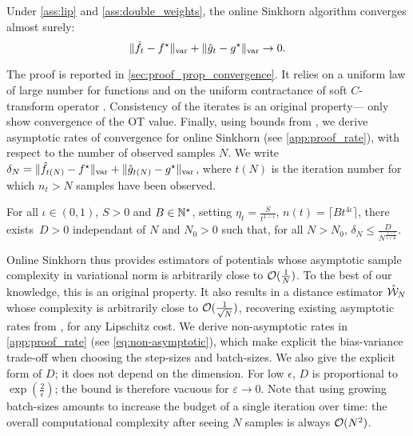 \begin{proposition}\label{prop:convergence_true}
    Under \autoref{ass:lip} and
    \ref{ass:double_weights}, the online Sinkhorn algorithm converges almost surely:
    \begin{equation}
        \Vert \hat f_t - f^\star \Vert_{\text{\upshape var}} + \Vert \hat g_t - g^\star \Vert_{\text{\upshape var}} \to 0.
    \end{equation}
\end{proposition}

The proof is reported in \autoref{sec:proof_prop_convergence}. It relies on a uniform
law of large number for functions \citep[][chapter
19]{van_der_vaart_asymptotic_2000} and on the uniform contractance of soft
$C$-transform operator \citep[e.g.][Proposition 19]{vialard2019elementary}. Consistency of the iterates is an original property---\cite{2016-genevay-nips} only show convergence of the OT value. Finally, using bounds from \cite{moulines_non-asymptotic_2011}, we derive  asymptotic rates of convergence for online Sinkhorn (see \autoref{app:proof_rate}), with
respect to the number of observed samples $N$. We write $\delta_N = \Vert \hat
f_{t(N)} - f^\star \Vert_{\text{\upshape var}} + \Vert \hat g_{t(N)} - g^\star \Vert_{\text{\upshape var}}$,
where $t(N)$ is the iteration number for which $n_t > N$ samples have been observed.

\begin{proposition}\label{prop:rate}
    For all $\iota \in (0, 1)$, $S > 0$ and $B \in \mathbb{N}^\star$, setting $\eta_t =
    \frac{S}{t^{1 - \iota}}$, $n(t) = \lceil B t^{4\iota} \rceil$, there
    exists~$D > 0$ independant of $N$ and $N_0 > 0$ such that, for all $N >
    N_0$, $\delta_N \leq \frac{D}{N^{\frac{1 - \iota}{1 + 4 \iota}}}$.
\end{proposition}

Online Sinkhorn thus provides estimators of potentials whose asymptotic sample
complexity in variational norm is arbitrarily close to $\mathcal{O}(\frac{1}{N})$. To
the best of our knowledge, this is an original property. It also results in a
distance estimator $\hat {\mathcal{W}}_N$ whose complexity is arbitrarily close to
$\mathcal{O}(\frac{1}{\sqrt{N}})$, recovering existing asymptotic rates from
\cite{2019-Genevay-aistats}, for any Lipschitz cost. We derive non-asymptotic rates in \autoref{app:proof_rate}
(see \eqref{eq:non-asymptotic}), which make explicit the bias-variance trade-off
when choosing the step-sizes and batch-sizes. We also give the explicit form
of $D$; it does not depend on the dimension. For low $\epsilon$,
$D$ is proportional to $\exp(\frac{2}{\epsilon})$; the bound is therefore vacuous for
$\varepsilon \to 0$. Note that using growing
batch-sizes amounts to increase the budget of a single iteration over time: the
overall computational complexity after seeing $N$ samples is always $\mathcal{O}(N^2)$.

